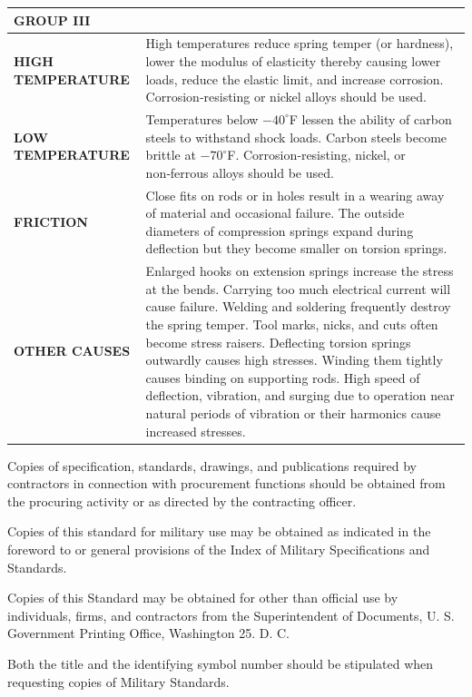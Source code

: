 \documentclass[10pt]{article}
\begin{document}
\begin{table}[h!]
\begin{tabularx}{\textwidth}{|p{3cm}|p{12cm}|}
\multicolumn{2}{|l|}{\textbf{GROUP III}} \\
\hline
\textbf{HIGH TEMPERATURE} &
High temperatures reduce spring temper (or hardness), lower the modulus of elasticity thereby causing lower loads, reduce the elastic limit, and increase corrosion. Corrosion‑resisting or nickel alloys should be used. \\
\hline
\textbf{LOW TEMPERATURE} &
Temperatures below $-40^\circ$F lessen the ability of carbon steels to withstand shock loads. Carbon steels become brittle at $-70^\circ$F. Corrosion‑resisting, nickel, or non‑ferrous alloys should be used. \\
\hline
\textbf{FRICTION} &
Close fits on rods or in holes result in a wearing away of material and occasional failure. The outside diameters of compression springs expand during deflection but they become smaller on torsion springs. \\
\hline
\textbf{OTHER CAUSES} &
Enlarged hooks on extension springs increase the stress at the bends. Carrying too much electrical current will cause failure. Welding and soldering frequently destroy the spring temper. Tool marks, nicks, and cuts often become stress raisers. Deflecting torsion springs outwardly causes high stresses. Winding them tightly causes binding on supporting rods. High speed of deflection, vibration, and surging due to operation near natural periods of vibration or their harmonics cause increased stresses. \\
\hline

\end{tabularx}
\end{table}


\clearpage
Copies of specification, standards, drawings, and publications required by contractors in connection with procurement functions should be obtained from the procuring activity or as directed by the contracting officer.

Copies of this standard for military use may be obtained as indicated in the foreword to or general provisions of the Index of Military Specifications and Standards.

Copies of this Standard may be obtained for other than official use by individuals, firms, and contractors from the Superintendent of Documents, U. S. Government Printing Office, Washington 25. D. C.

Both the title and the identifying symbol number should be stipulated when requesting copies of Military Standards.
\end{document}
